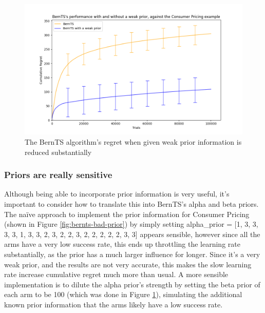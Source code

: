 \begin{figure}[h!]
    \centering
    \includegraphics[width=17cm]{report/images/BernTS-good-priors-cp.png}
    \caption{The BernTS algorithm's regret when given weak prior information is reduced substantially}
    \label{fig:bernts-good-prior}
\end{figure}

\subsubsection{Priors are really sensitive}\label{sensitive_priors}

Although being able to incorporate prior information is very useful, it's important to consider how to translate this into BernTS's alpha and beta priors. The naïve approach to implement the prior information for Consumer Pricing (shown in Figure \ref{fig:bernts-bad-prior}) by simply setting alpha\_prior = [1, 3, 3, 3, 3, 1, 3, 3, 2, 3, 2, 2, 3, 2, 2, 2, 2, 2, 3, 3] appears sensible, however since all the arms have a very low success rate, this ends up throttling the learning rate substantially, as the prior has a much larger influence for longer. Since it's a very weak prior, and the results are not very accurate, this makes the slow learning rate increase cumulative regret much more than usual. A more sensible implementation is to dilute the alpha prior's strength by setting the beta prior of each arm to be 100 (which was done in Figure \ref{fig:bernts-good-prior}), simulating the additional known prior information that the arms likely have a low success rate.

